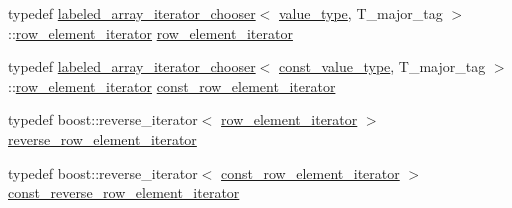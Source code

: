 \begin{DoxyCompactItemize}
\item 
typedef \hyperlink{namespaceIceBRG_structIceBRG_1_1labeled__array__iterator__chooser}{labeled\+\_\+array\+\_\+iterator\+\_\+chooser}$<$ \hyperlink{classIceBRG_1_1labeled__array_a183002e8991647a6fbed8c13b64ff8f4}{value\+\_\+type}, T\+\_\+major\+\_\+tag $>$\+::\hyperlink{classIceBRG_1_1labeled__array_a9b24e3ef822b100eeffa9aedea0a362a}{row\+\_\+element\+\_\+iterator} \hyperlink{classIceBRG_1_1labeled__array_a9b24e3ef822b100eeffa9aedea0a362a}{row\+\_\+element\+\_\+iterator}
\item 
typedef \hyperlink{namespaceIceBRG_structIceBRG_1_1labeled__array__iterator__chooser}{labeled\+\_\+array\+\_\+iterator\+\_\+chooser}$<$ \hyperlink{classIceBRG_1_1labeled__array_a4b9270762c39bd24b1f7855a7e21a63d}{const\+\_\+value\+\_\+type}, T\+\_\+major\+\_\+tag $>$\+::\hyperlink{classIceBRG_1_1labeled__array_a9b24e3ef822b100eeffa9aedea0a362a}{row\+\_\+element\+\_\+iterator} \hyperlink{classIceBRG_1_1labeled__array_a15c0340b56b118a2a9f4b3e644de7d71}{const\+\_\+row\+\_\+element\+\_\+iterator}
\item 
typedef boost\+::reverse\+\_\+iterator$<$ \hyperlink{classIceBRG_1_1labeled__array_a9b24e3ef822b100eeffa9aedea0a362a}{row\+\_\+element\+\_\+iterator} $>$ \hyperlink{classIceBRG_1_1labeled__array_a00f3c91706206fdb42140d6b2d30839b}{reverse\+\_\+row\+\_\+element\+\_\+iterator}
\item 
typedef boost\+::reverse\+\_\+iterator$<$ \hyperlink{classIceBRG_1_1labeled__array_a15c0340b56b118a2a9f4b3e644de7d71}{const\+\_\+row\+\_\+element\+\_\+iterator} $>$ \hyperlink{classIceBRG_1_1labeled__array_a585569389ad58ee93baab2bc1dc09a48}{const\+\_\+reverse\+\_\+row\+\_\+element\+\_\+iterator}
\end{DoxyCompactItemize}
